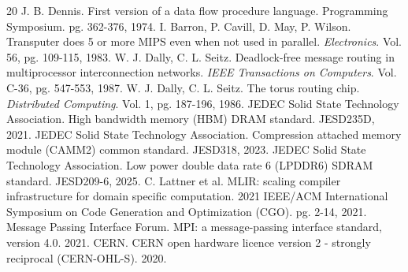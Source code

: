 \documentclass[10pt,twocolumn]{article}
\begin{document}
\begin{thebibliography}{20}
 J. B. Dennis. First version of a data flow procedure language. Programming Symposium. pg. 362-376, 1974.
 I. Barron, P. Cavill, D. May, P. Wilson. Transputer does 5 or more MIPS even when not used in parallel. \textit{Electronics}. Vol. 56, pg. 109-115, 1983.
 W. J. Dally, C. L. Seitz. Deadlock-free message routing in multiprocessor interconnection networks. \textit{IEEE Transactions on Computers}. Vol. C-36, pg. 547-553, 1987.
 W. J. Dally, C. L. Seitz. The torus routing chip. \textit{Distributed Computing}. Vol. 1, pg. 187-196, 1986.
 JEDEC Solid State Technology Association. High bandwidth memory (HBM) DRAM standard. JESD235D, 2021.
 JEDEC Solid State Technology Association. Compression attached memory module (CAMM2) common standard. JESD318, 2023.
 JEDEC Solid State Technology Association. Low power double data rate 6 (LPDDR6) SDRAM standard. JESD209-6, 2025.
 C. Lattner et al. MLIR: scaling compiler infrastructure for domain specific computation. 2021 IEEE/ACM International Symposium on Code Generation and Optimization (CGO). pg. 2-14, 2021.
 Message Passing Interface Forum. MPI: a message-passing interface standard, version 4.0. 2021.
 CERN. CERN open hardware licence version 2 - strongly reciprocal (CERN-OHL-S). 2020.
\end{thebibliography}
\end{document}
